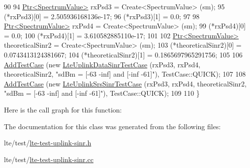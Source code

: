\begin{DoxyCode}
90 
94   \hyperlink{classns3_1_1Ptr}{Ptr<SpectrumValue>} rxPsd3 = Create<SpectrumValue> (sm);
95   (*rxPsd3)[0] = 2.505936168136e-17;
96   (*rxPsd3)[1] = 0.0;
97 
98   \hyperlink{classns3_1_1Ptr}{Ptr<SpectrumValue>} rxPsd4 = Create<SpectrumValue> (sm);
99   (*rxPsd4)[0] = 0.0;
100   (*rxPsd4)[1] = 3.610582885110e-17;
101 
102   \hyperlink{classns3_1_1Ptr}{Ptr<SpectrumValue>} theoreticalSinr2 = Create<SpectrumValue> (sm);
103   (*theoreticalSinr2)[0] = 0.0743413124381667;
104   (*theoreticalSinr2)[1] = 0.1865697965291756;
105 
106   \hyperlink{classns3_1_1TestCase_a3718088e3eefd5d6454569d2e0ddd835}{AddTestCase} (\textcolor{keyword}{new} \hyperlink{classLteUplinkDataSinrTestCase}{LteUplinkDataSinrTestCase} (rxPsd3, rxPsd4, 
      theoreticalSinr2, \textcolor{stringliteral}{"sdBm = [-63 -inf] and [-inf -61]"}), TestCase::QUICK);
107   
108   \hyperlink{classns3_1_1TestCase_a3718088e3eefd5d6454569d2e0ddd835}{AddTestCase} (\textcolor{keyword}{new} \hyperlink{classLteUplinkSrsSinrTestCase}{LteUplinkSrsSinrTestCase} (rxPsd3, rxPsd4, 
      theoreticalSinr2, \textcolor{stringliteral}{"sdBm = [-63 -inf] and [-inf -61]"}), TestCase::QUICK);
109 
110 \}
\end{DoxyCode}


Here is the call graph for this function\+:




The documentation for this class was generated from the following files\+:\begin{DoxyCompactItemize}
\item 
lte/test/\hyperlink{lte-test-uplink-sinr_8h}{lte-\/test-\/uplink-\/sinr.\+h}\item 
lte/test/\hyperlink{lte-test-uplink-sinr_8cc}{lte-\/test-\/uplink-\/sinr.\+cc}\end{DoxyCompactItemize}
